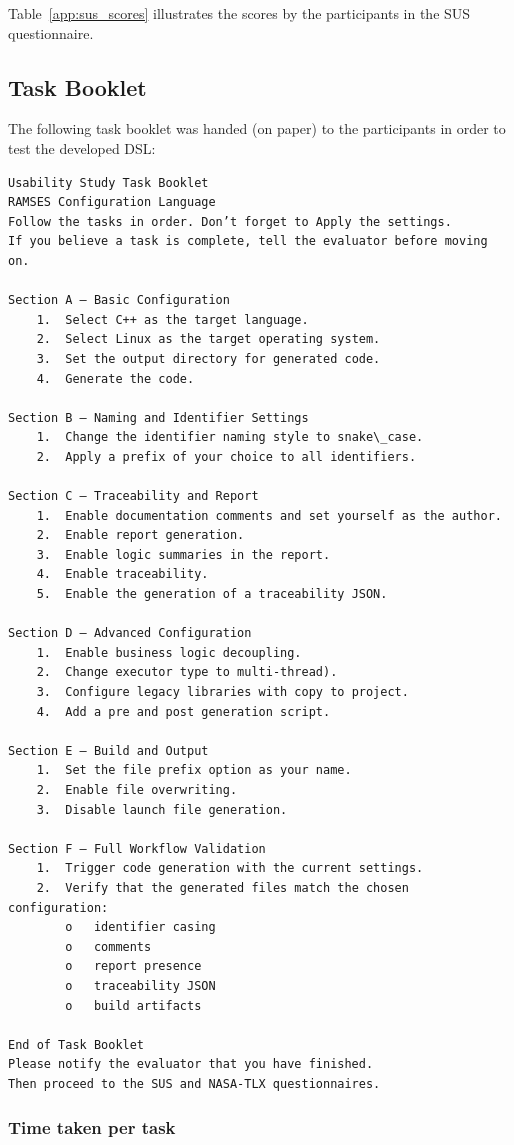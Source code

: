 Table~\ref{app:sus_scores} illustrates the scores by the participants in the \gls{SUS} questionnaire.

\subsection{Task Booklet}
\label{app:task_book}

The following task booklet was handed (on paper) to the participants in order to test the developed \gls{DSL}:


\begin{verbatim}
Usability Study Task Booklet
RAMSES Configuration Language
Follow the tasks in order. Don’t forget to Apply the settings.
If you believe a task is complete, tell the evaluator before moving on.

Section A – Basic Configuration
	1.	Select C++ as the target language.
	2.	Select Linux as the target operating system.
	3.	Set the output directory for generated code.
	4.	Generate the code.
	
Section B – Naming and Identifier Settings
	1.	Change the identifier naming style to snake\_case.
	2.	Apply a prefix of your choice to all identifiers.
	
Section C – Traceability and Report
	1.	Enable documentation comments and set yourself as the author.
	2.	Enable report generation.
	3.	Enable logic summaries in the report.
	4.	Enable traceability.
	5.	Enable the generation of a traceability JSON.
	
Section D – Advanced Configuration
	1.	Enable business logic decoupling.
	2.	Change executor type to multi-thread).
	3.	Configure legacy libraries with copy to project.
	4.	Add a pre and post generation script.

Section E – Build and Output
	1.	Set the file prefix option as your name.
	2.	Enable file overwriting.
	3.	Disable launch file generation.

Section F – Full Workflow Validation
	1.	Trigger code generation with the current settings.
	2.	Verify that the generated files match the chosen configuration:
		o	identifier casing
		o	comments
		o	report presence
		o	traceability JSON
		o	build artifacts
	
End of Task Booklet
Please notify the evaluator that you have finished.
Then proceed to the SUS and NASA-TLX questionnaires.
\end{verbatim}

\subsubsection{Time taken per task}
\label{app:ttpt}

